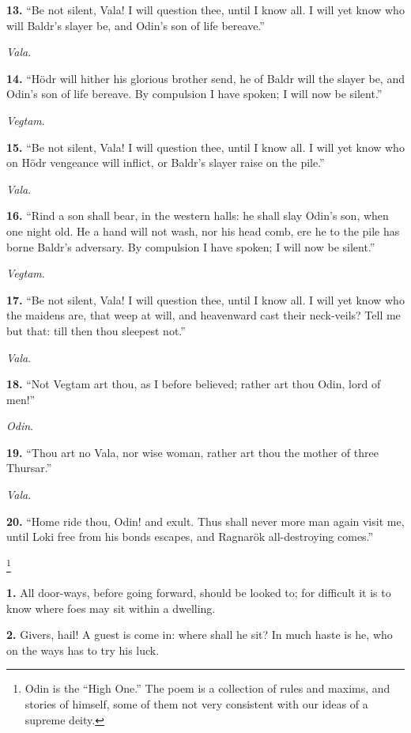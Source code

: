 \textbf{13.} ``Be not silent, Vala! I will question thee, until I know all. I
will yet know who will Baldr's slayer be, and Odin's son of life
bereave.''

\emph{Vala}.

\textbf{14.} ``Hödr will hither his glorious brother send, he of Baldr will
the slayer be, and Odin's son of life bereave. By compulsion I have
spoken; I will now be silent.''

\emph{Vegtam}.

\textbf{15.} ``Be not silent, Vala! I will question thee, until I know all. I
will yet know who on Hödr vengeance will inflict, or Baldr's slayer
raise on the pile.''

\emph{Vala}.

\textbf{16.} ``Rind a son shall bear, in the western halls: he shall slay
Odin's son, when one night old. He a hand will not wash, nor his head
comb, ere he to the pile has borne Baldr's adversary. By compulsion I
have spoken; I will now be silent.''

\emph{Vegtam}.

\textbf{17.} ``Be not silent, Vala! I will question thee, until I know all. I
will yet know who the maidens are, that weep at will, and heavenward
cast their neck-veils? Tell me but that: till then thou sleepest not.''

\emph{Vala}.

\textbf{18.} ``Not Vegtam art thou, as I before believed; rather art thou
Odin, lord of men!''

\emph{Odin}.

\textbf{19.} ``Thou art no Vala, nor wise woman, rather art thou the mother of
three Thursar.''

\emph{Vala}.

\textbf{20.} ``Home ride thou, Odin! and exult. Thus shall never more man
again visit me, until Loki free from his bonds escapes, and Ragnarök
all-destroying comes.''


\footnote{Odin is the ``High One.'' The poem is a collection of
rules and maxims, and stories of himself, some of them not very
consistent with our ideas of a supreme deity.}

\textbf{1.} All door-ways, before going forward, should be looked to; for
difficult it is to know where foes may sit within a dwelling.

\textbf{2.} Givers, hail! A guest is come in: where shall he sit? In much
haste is he, who on the ways has to try his luck.


